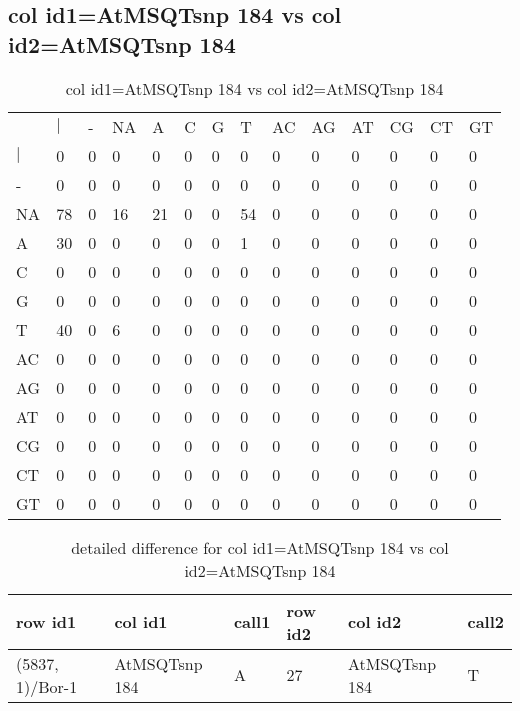 \subsection{col id1=AtMSQTsnp 184 vs col id2=AtMSQTsnp 184}
\begin{center}
\begin{longtable}{|l|l|l|l|l|l|l|l|l|l|l|l|l|l|}
\caption{col id1=AtMSQTsnp 184 vs col id2=AtMSQTsnp 184} \label{table_dm560}\\
\hline
\\
\hline
&$|$&-&NA&A&C&G&T&AC&AG&AT&CG&CT&GT\\
$|$&0&0&0&0&0&0&0&0&0&0&0&0&0\\
-&0&0&0&0&0&0&0&0&0&0&0&0&0\\
NA&78&0&16&21&0&0&54&0&0&0&0&0&0\\
A&30&0&0&0&0&0&1&0&0&0&0&0&0\\
C&0&0&0&0&0&0&0&0&0&0&0&0&0\\
G&0&0&0&0&0&0&0&0&0&0&0&0&0\\
T&40&0&6&0&0&0&0&0&0&0&0&0&0\\
AC&0&0&0&0&0&0&0&0&0&0&0&0&0\\
AG&0&0&0&0&0&0&0&0&0&0&0&0&0\\
AT&0&0&0&0&0&0&0&0&0&0&0&0&0\\
CG&0&0&0&0&0&0&0&0&0&0&0&0&0\\
CT&0&0&0&0&0&0&0&0&0&0&0&0&0\\
GT&0&0&0&0&0&0&0&0&0&0&0&0&0\\
\hline
\end{longtable}
\end{center}

\begin{center}
\begin{longtable}{|l|l|l|l|l|l|}
\caption{detailed difference for col id1=AtMSQTsnp 184 vs col id2=AtMSQTsnp 184} \label{table_dm561}\\
\hline
row id1&col id1&call1&row id2&col id2&call2\\
\hline
(5837, 1)/Bor-1&AtMSQTsnp 184&A&27&AtMSQTsnp 184&T\\
\hline
\end{longtable}
\end{center}

